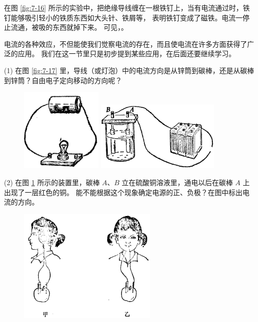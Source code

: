 在图 \ref{fig:7-16} 所示的实验中，把绝缘导线缠在一根铁钉上，当有电流通过时，铁钉能够吸引轻小的铁质东西如大头针、铁屑等，
表明铁钉变成了磁铁。电流一停止流通，被吸的东西就掉下来。
可见，。

电流的各种效应，不但能使我们觉察电流的存在，而且使电流在许多方面获得了广泛的应用。
我们在这一节里只是初步提到某些应用，在后面还要继续学习。


\lianxi

(1) 在图 \ref{fig:7-17} 里，导线（或灯泡）中的电流方向是从锌筒到碳棒，还是从碳棒到锌筒？自由电子定向移动的方向呢？

\begin{figure}[htbp]
    \centering
    \begin{minipage}{7cm}
    \centering
    \includegraphics[width=4cm]{../pic/czwl2-ch7-17}
    \caption{}\label{fig:7-17}
    \end{minipage}
    \qquad
    \begin{minipage}{7cm}
    \centering
    \includegraphics[width=6cm]{../pic/czwl2-ch7-18}
    \caption{}\label{fig:7-18}
    \end{minipage}
\end{figure}

(2) 在图 \ref{fig:7-18} 所示的装置里，碳棒 $A$、$B$ 立在硫酸铜溶液里，通电以后在碳棒 $A$ 上出现了一层红色的铜。
能不能根据这个现象确定电源的正、负极？在图中标出电流的方向。

\begin{figure}[htbp]
    \centering
    \includegraphics[width=0.6\textwidth]{../pic/czwl2-ch7-19}
    \caption{}\label{fig:7-19}
\end{figure}

